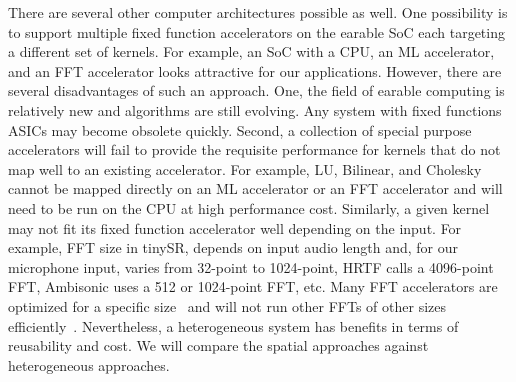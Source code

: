There are several other computer architectures possible as well. 
One possibility is to support multiple fixed function accelerators on the earable SoC each targeting a different set of kernels. For example, an SoC with a CPU, an ML accelerator, and an FFT accelerator looks attractive for our applications. However, there are several disadvantages of such an approach. One, the field of earable computing is relatively new and algorithms are still evolving. Any system with fixed functions ASICs may become obsolete quickly. 
Second,  
a collection of special purpose accelerators will fail to provide the requisite performance for kernels that do not map well to an existing accelerator. For example, LU, Bilinear, and Cholesky cannot be mapped directly on an ML accelerator or an FFT accelerator and will need to be run on the CPU at high performance cost. Similarly, a given kernel may not fit its fixed function accelerator well depending on the input. For example, FFT size in tinySR, depends on input audio length and, for our
microphone input, varies from 32-point to 
1024-point, HRTF calls a 4096-point FFT, Ambisonic uses a 512 or 1024-point FFT, etc. Many FFT accelerators are optimized for a specific size~\cite{fft01} and will not run other FFTs of other sizes efficiently~\cite{fft02}. 
Nevertheless, a heterogeneous system has benefits in terms of reusability and cost. We will compare the spatial approaches against heterogeneous approaches.

